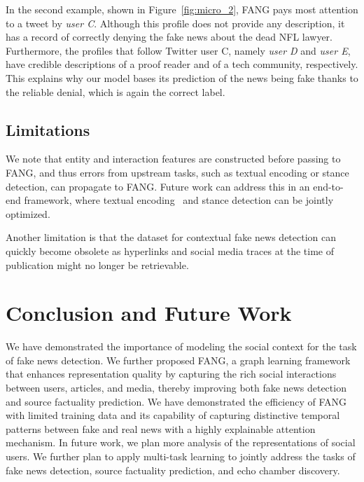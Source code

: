 \documentclass[sigconf]{acmart}
\theoremstyle{definition}
\theoremstyle{hypothesis}
\begin{document}
In the second example, shown in Figure~\ref{fig:micro_2}, 
FANG pays most attention to a tweet by \textit{user C}. Although this profile does not provide any description, it has a record of correctly denying the fake news about the dead NFL lawyer. Furthermore, the profiles that follow Twitter user C, namely \textit{user D} and \textit{user E}, have credible descriptions of 
a proof reader and of a tech community, respectively. 
This explains why our model bases its prediction of the news being fake thanks to the reliable denial, which is again the correct label.

\subsection{Limitations}
We note that entity and interaction features are constructed before passing to FANG, and thus errors from upstream tasks, such as textual encoding or stance detection, can propagate to FANG. Future work can address this in an end-to-end framework, where textual encoding~\cite{devlin2019bert} and stance detection can be jointly optimized.

Another limitation is that the dataset for contextual fake news detection can quickly become obsolete as hyperlinks and social media traces at the time of publication might no longer be retrievable.

\section{Conclusion and Future Work}
We have demonstrated the importance of modeling the social context for the task of fake news detection. We further proposed FANG, a graph learning framework that enhances representation quality by capturing the rich social interactions between users, articles, and media, thereby improving both fake news detection and source factuality prediction. 
We have demonstrated the efficiency of FANG with limited training data and its capability of capturing distinctive temporal patterns between fake and real news with a highly explainable attention mechanism. 
In future work, we plan more analysis of the representations of social users. We further plan to apply multi-task learning 
to jointly address the tasks of fake news detection, source factuality prediction, and echo chamber discovery.




\appendix
\end{document}
